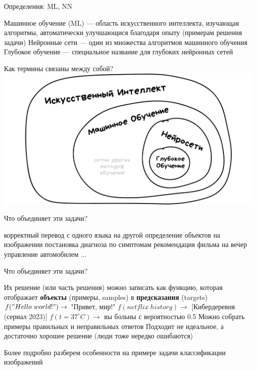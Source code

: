 \documentclass[aspectratio=169, professionalfonts]{beamer}
\begin{document}
\begin{frame}{Определения: ML, NN}
    \begin{outline}
        \1 Машинное обучение (ML) --- область искусственного интеллекта, изучающая алгоритмы,
        автоматически улучшающися благодаря опыту (примерам решения задачи)
        \1 Нейронные сети --- один из множества алгоритмов машинного обучения
        \1 Глубокое обучение --- специальное название для глубоких нейронных сетей
    \end{outline}
\end{frame}

\begin{frame}{Как термины связаны между собой?}
    \centering
    \includegraphics[width=.9\linewidth]{figures/fig6-terms.jpg}
\end{frame}

\begin{frame}{Что объединяет эти задачи?}
    \begin{outline}
        \1 корректный перевод с одного языка на другой
        \1 определение объектов на изображении
        \1 постановка диагноза по симптомам
        \1 рекомендация фильма на вечер
        \1 управление автомобилем
        \1 ...
    \end{outline}
\end{frame}

\begin{frame}{Что объединяет эти задачи?}
    \begin{outline}
        \1 Их решение (или часть решения) можно записать как функцию, которая отображает
        \textbf{объекты} (примеры, samples) в \textbf{предсказания} (targets)
            \2 \( f("Hello \ world!") \to \) "Привет, мир!"
            \2 \( f(netflix \ history) \to \) [Кибердеревня (сериал 2023)]
            \2 \( f(t = 37^\circ C) \to \) вы больны с вероятностью 0.5
        \pause
        \1 Можно собрать примеры правильных и неправильных ответов
        \pause
        \1 Подходит не идеальное, а достаточно хорошее решение
            (люди тоже нередко ошибаются)
    \end{outline}

    Более подробно разберем особенности на примере задачи классификации изображений
\end{frame}
\end{document}
